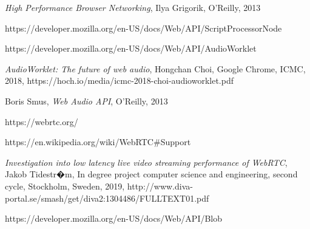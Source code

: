 \documentclass[11pt, a4paper, twoside]{article}
\begin{document}
\begin{thebibliography}{9}

  \textit{High Performance Browser Networking},
  Ilya Grigorik,
  O'Reilly,
  2013
  
  https://developer.mozilla.org/en-US/docs/Web/API/ScriptProcessorNode

  https://developer.mozilla.org/en-US/docs/Web/API/AudioWorklet

  \textit{AudioWorklet: The future of web audio},
  Hongchan Choi,
  Google Chrome,
  ICMC,
  2018,
  https://hoch.io/media/icmc-2018-choi-audioworklet.pdf

  Boris Smus,
  \textit{Web Audio API},
  O'Reilly,
  2013

  https://webrtc.org/
  
  https://en.wikipedia.org/wiki/WebRTC\#Support
  
\bibitem{}
  \textit{Investigation into low latency live video streaming performance of WebRTC},\newline
  Jakob Tidestr�m,
  In degree project computer science and engineering, second cycle, \newline
  Stockholm,
  Sweden,
  2019,\newline
  http://www.diva-portal.se/smash/get/diva2:1304486/FULLTEXT01.pdf


  https://developer.mozilla.org/en-US/docs/Web/API/Blob
  
\end{thebibliography}
\end{document}
